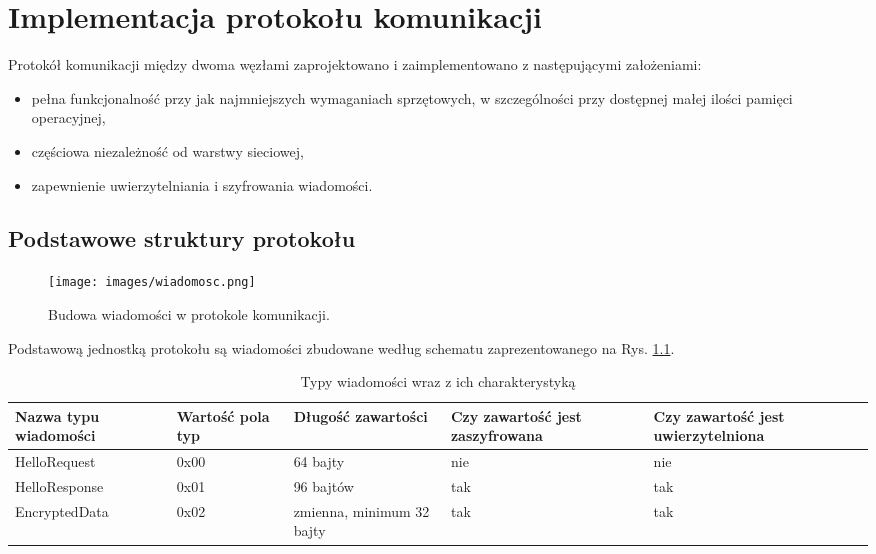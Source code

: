 \chapter{Implementacja protokołu komunikacji}
\label{cha:implementacja}

Protokół komunikacji między dwoma węzłami zaprojektowano i zaimplementowano z następującymi założeniami:

\begin{itemize}
\item pełna funkcjonalność przy jak najmniejszych wymaganiach sprzętowych, w szczególności przy dostępnej małej ilości pamięci operacyjnej,
\item częściowa niezależność od warstwy sieciowej,
\item zapewnienie uwierzytelniania i szyfrowania wiadomości.
\end{itemize}

\section{Podstawowe struktury protokołu}
\label{sec:proto}

\begin{figure}[h]
\centering
\texttt{[image: images/wiadomosc.png]}
\caption{Budowa wiadomości w protokole komunikacji.}
\label{fig:message-def}
\end{figure}

Podstawową jednostką protokołu są wiadomości zbudowane według schematu zaprezentowanego na Rys. \ref{fig:message-def}.

\begin{table}[t]
\centering
\caption{Typy wiadomości wraz z ich charakterystyką}
\begin{tabular}{|p{2.3cm}|p{1.4cm}|l|p{2.9cm}|p{3.1cm}|}
    \hline
    \textbf{Nazwa typu wiadomości}  &
    \textbf{Wartość pola typ}  &
    \textbf{Długość zawartości}  &
    \textbf{Czy zawartość jest zaszyfrowana}  &
    \textbf{Czy zawartość jest uwierzytelniona}\\
    \hline
    HelloRequest & 0x00 & 64 bajty & nie & nie\\
    \hline
    HelloResponse & 0x01 & 96 bajtów & tak & tak\\
    \hline
    EncryptedData & 0x02 & zmienna, minimum 32 bajty & tak & tak\\
    \hline
\end{tabular}
\label{tab:recordtypes}
\end{table}


